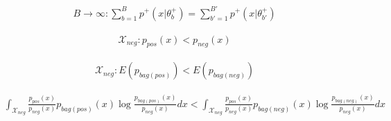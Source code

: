 \begin{align}
  B \rightarrow \infty : 
  \sum_{b = 1} ^B p^+(x|\theta_b^+) =  \sum_{b' = 1} ^{B'} p^+(x|\theta_{b'}^+)
\end{align}


\begin{align}
  \mathcal{X}_{neg}: p_{pos} (x) < p_{neg} (x) 
\end{align}
 
\begin{align}
  \mathcal{X}_{neg}: E(p_{bag(pos)}) < E(p_{bag(neg)})
\end{align}

\begin{align*}
  \int_{\mathcal{X}_{neg}} \frac{p_{pos}(x)}{p_{neg}(x)} p_{bag(pos)}(x) \log \frac{p_{bag(pos)}(x)}{p_{neg}(x)} dx <
   \int_{\mathcal{X}_{neg}} \frac{p_{pos}(x)}{p_{neg}(x)} p_{bag(neg)}(x) \log \frac{p_{bag(neg)}(x)}{p_{neg}(x)} dx
\end{align*}
 